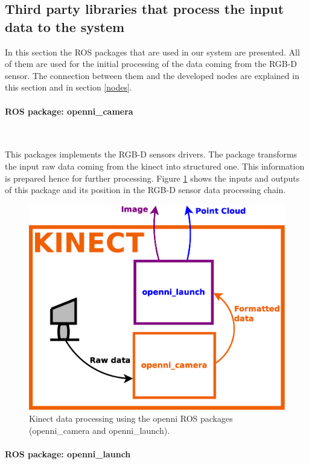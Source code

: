 \subsection{Third party libraries that process the input data to the system}
\label{ros_packages}
In this section the ROS packages that are used in our system are presented. 
All of them are used for the initial processing of the data coming from the RGB-D sensor. 
The connection between them and the developed nodes are explained in this section and in section \ref{nodes}.

\paragraph{ROS package: openni\_camera}\mbox{} \\
\label{openni_camera}

This packages implements the RGB-D sensors drivers.
The package transforms the input raw data coming from the kinect into structured one. 
This information is prepared hence for further processing. 
Figure \ref{diagram_kinect_data} shows the inputs and outputs of this package and its position in the RGB-D sensor data processing chain. 
 
 		\begin{figure}[H]
			\begin{center}
			\includegraphics[width=0.5\linewidth]{img/diagrams/kinect_data.eps}
			\caption[Kinect data processing]{Kinect data processing using the openni ROS packages (openni\_camera and openni\_launch).}
			\label{diagram_kinect_data}
			\end{center}
		\end{figure}


\paragraph{ROS package: openni\_launch}\mbox{}\\
\label{openni_launch}

